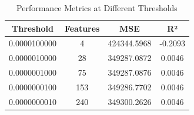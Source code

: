 \begin{table}[ht]
    \centering
    \begin{tabular}{c c c c} %
        \toprule
        \textbf{Threshold} & \textbf{Features} & \textbf{MSE} & \textbf{R²} \\
        \midrule
        0.0000100000 &  4   & 424344.5968 & -0.2093 \\
        0.0000010000 & 28   & 349287.0872 &  0.0046 \\
        0.0000001000 & 75   & 349287.0876 &  0.0046 \\
        0.0000000100 & 153  & 349286.7702 &  0.0046 \\
        0.0000000010 & 240  & 349300.2626 &  0.0046 \\
        \bottomrule
    \end{tabular}
    \caption{Performance Metrics at Different Thresholds}
    \label{tab:threshold_metrics}
\end{table}


